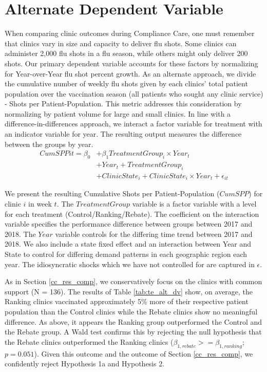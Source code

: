 \section{Alternate Dependent Variable} \label{cc_alt_dv}
When comparing clinic outcomes during Compliance Care, one must remember that clinics vary in size and capacity to deliver flu shots. Some clinics can administer 2,000 flu shots in a flu season, while others might only deliver 200 shots. Our primary dependent variable accounts for these factors by normalizing for Year-over-Year flu shot percent growth. As an alternate approach, we divide the cumulative number of weekly flu shots given by each clinics’ total patient population over the vaccination season (all patients who sought any clinic service) - Shots per Patient-Population. This metric addresses this consideration by normalizing by patient volume for large and small clinics. In line with a difference-in-differences approach, we interact a factor variable for treatment with an indicator variable for year. The resulting output measures the difference between the groups by year.  
  \begin{equation} \tag{4} \begin{split}
       CumSPP{it} = \beta_0 & + \beta_1 TreatmentGroup_i \times Year_t \\
       & + Year_t + TreatmentGroup_i \\ & + ClinicState_i + ClinicState_i \times Year_t + \epsilon_{it} 
  \end{split}  \end{equation}

We present the resulting Cumulative Shots per Patient-Population ($CumSPP$) for clinic $i$ in week $t$. The $TreatmentGroup$ variable is a factor variable with a level for each treatment (Control/Ranking/Rebate). The coefficient on the interaction variable specifies the performance difference between groups between 2017 and 2018. The $Year$ variable controls for the differing time trend between 2017 and 2018. We also include a state fixed effect and an interaction between Year and State to control for differing demand patterns in each geographic region each year. The idiosyncratic shocks which we have not controlled for are captured in $\epsilon$. 

As in Section \ref{cc_res_comp}, we conservatively focus on the clinics with common support (N = 136). The results of Table \ref{tab:te_alt_dv} show, on average, the Ranking clinics vaccinated approximately 5\% more of their respective patient population than the Control clinics while the Rebate clinics show no meaningful difference. As above, it appears the Ranking group outperformed the Control and the Rebate group. A Wald test confirms this by rejecting the null hypothesis that the Rebate clinics outperformed the Ranking clinics ($\beta_{1,rebate} >= \beta_{1,ranking}$; $p = 0.051$). Given this outcome and the outcome of Section \ref{cc_res_comp}, we confidently reject Hypothesis 1a and Hypothesis 2.

